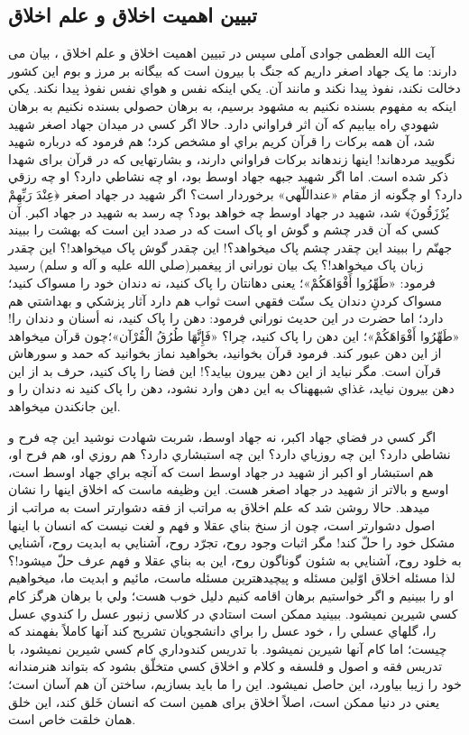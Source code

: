 \subsection{تبيين  اهمیت اخلاق و علم اخلاق}
آیت الله العظمی جوادی آملی سپس در تبيين  اهمیت اخلاق و علم اخلاق ، بیان می دارند:
ما يک جهاد اصغر داريم که جنگ با بيرون است که بيگانه بر مرز و بوم اين کشور دخالت نکند، نفوذ پيدا نکند و مانند آن. يکي اينکه نفس و هواي نفس نفوذ پيدا نکند. يکي اينکه به مفهوم بسنده نکنيم به مشهود برسيم، به برهان حصولي بسنده نکنيم به برهان شهودي راه بيابيم که آن اثر فراواني دارد.
حالا اگر کسي در ميدان جهاد اصغر شهيد شد، آن همه برکات را قرآن کريم براي او مشخص کرد؛ هم فرمود که  درباره شهيد نگوييد مرده﻿اند! اينها زنده﻿اند برکات فراواني دارند، و بشارتهایی که در قرآن برای شهدا ذکر شده است.
اما اگر شهيد جبهه جهاد اوسط بود، او چه نشاطي دارد؟ او چه رزقي دارد؟ او چگونه از مقام «عنداللّهي» برخوردار است؟ اگر شهيد در جهاد اصغر ﴿عِنْدَ رَبِّهِمْ يُرْزَقُونَ﴾ شد، شهيد در جهاد اوسط چه خواهد بود؟ چه رسد به شهيد در جهاد اکبر. آن کسي که آن قدر چشم و گوش او پاک است که در صدد اين است که بهشت را ببيند جهنّم را ببيند اين چقدر چشم پاک مي﻿خواهد؟! اين چقدر گوش پاک مي﻿خواهد!؟ اين چقدر زبان پاک مي﻿خواهد!؟ يک بيان نوراني از پيغمبر(صلي الله عليه و آله و سلم) رسيد فرمود: «طَهِّرُوا أَفْوَاهَكُمْ‏»؛ یعنی دهانتان را پاک کنيد، نه دندان خود را مسواک کنيد؛ مسواک کردنِ دندان يک سنّت فقهي است ثواب هم دارد آثار پزشکي و بهداشتي هم دارد؛ اما حضرت در اين حديث نوراني فرمود: دهن را پاک کنيد، نه أسنان و دندان را! «طَهِّرُوا أَفْوَاهَكُمْ‏»؛ اين دهن را پاک کنيد، چرا؟ «فَإِنَّهَا طُرُقُ الْقُرْآن‏‏»؛چون قرآن مي﻿خواهد از اين دهن عبور کند. فرمود قرآن بخوانيد، بخواهيد نماز بخوانيد که حمد و سوره﻿اش قرآن است. مگر نبايد از اين دهن بيرون بيايد؟! اين فضا را پاک کنيد، حرف بد از اين دهن بيرون نيايد، غذاي شبهه﻿ناک به اين دهن وارد نشود، دهن را پاک کنيد نه دندان را و اين جان﻿کندن مي﻿خواهد.

 اگر کسي در فضاي جهاد اکبر، نه جهاد اوسط، شربت شهادت نوشيد اين چه فرح و نشاطي دارد؟ اين چه روزي﻿اي دارد؟ اين چه استبشاري دارد؟ هم روزي او، هم فرح او، هم استبشار او اکبر از شهيد در جهاد اوسط است که آنچه براي جهاد اوسط است، اوسع و بالاتر از شهيد در جهاد اصغر هست. اين وظيفه ماست که اخلاق اينها را نشان مي﻿دهد.
 حالا روشن شد که علم اخلاق به مراتب از فقه دشوارتر است به مراتب از اصول دشوارتر است، چون از سنخ بناي عقلا و فهم و لغت نيست که انسان با اينها مشکل خود را حلّ کند! مگر اثبات وجود روح، تجرّد روح، آشنايي به ابديت روح، آشنايي به خلود روح، آشنايي به شئون گوناگون روح، اين به بناي عقلا و فهم عرف حلّ مي﻿شود!؟ لذا مسئله اخلاق اوّلين مسئله و پيچيده﻿ترين مسئله ماست، مائيم و ابديت ما، مي﻿خواهيم او را ببينيم و اگر خواستيم برهان اقامه کنيم دليل خوب هست؛ ولي با برهان هرگز کام کسي شيرين نمي﻿شود. ببينيد ممکن است استادي در کلاسي زنبور عسل را کندوي عسل را، گل﻿هاي عسلي را ، خود عسل را براي دانشجويان تشريح کند آنها کاملاً بفهمند که چيست؛ اما کام آنها شيرين نمي﻿شود. با تدريس کندوداري کام کسي شيرين نمي﻿شود، با تدريس فقه و اصول و فلسفه و کلام و اخلاق کسي متخلّق بشود که بتواند هنرمندانه خود را زيبا بياورد، این حاصل نمي﻿شود. اين را ما بايد بسازيم، ساختن آن هم آسان است؛ يعني در دنيا ممکن است، اصلاً اخلاق برای همين است که انسان خَلق کند، اين خلق همان خلقت خاص است.

